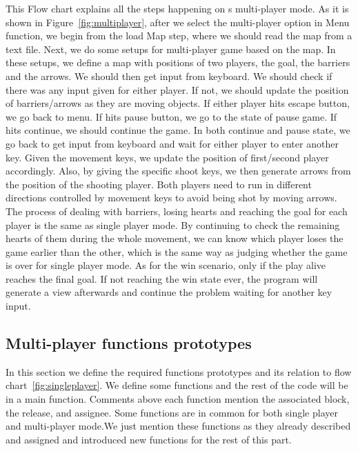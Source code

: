 This Flow chart explains all the steps happening on s multi-player mode. 
As it is shown in Figure~\ref{fig:multiplayer}, after we select the multi-player option in Menu function, we begin from the load Map step, where we should read the map from a text file. 
Next, we do some setups for multi-player game based on the map. 
In these setups, we define a map with positions of two players, the goal, the barriers and the arrows. 
We should then get input from keyboard. 
We should check if there was any input given for either player. 
If not, we should update the position of barriers/arrows as they are moving objects. 
If either player hits escape button, we go back to menu. 
If hits pause button, we go to the state of pause game. 
If hits continue, we should continue the game. 
In both continue and pause state, we go back to get input from keyboard and wait for either player to enter another key. 
Given the movement keys, we update the position of first/second player accordingly. 
Also, by giving the specific shoot keys, we then generate arrows from the position of the shooting player. 
Both players need to run in different directions controlled by movement keys to avoid being shot by moving arrows. 
The process of dealing with barriers, losing hearts and reaching the goal for each player is the same as single player mode. 
By continuing to check the remaining hearts of them during the whole movement, we can know which player loses the game earlier than the other, which is the same way as judging whether the game is over for single player mode. 
As for the win scenario, only if the play alive reaches the final goal. 
If not reaching the win state ever, the program will generate a view afterwards and continue the problem waiting for another key input.

\subsection{Multi-player functions prototypes}

In this section we define the required functions prototypes and its relation to flow chart~\ref{fig:singleplayer}. We define some functions and the rest of the code will be in a main function. Comments above each function mention the associated block, the release, and assignee. Some functions are in common for both single player and multi-player mode.We just mention these functions as they already described and assigned and introduced new functions for the rest of this part.

